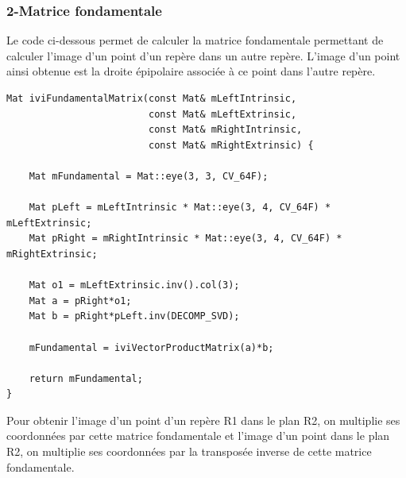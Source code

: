 \documentclass[a4paper,12pt]{report}
\begin{document}
\subsubsection*{2-Matrice fondamentale}
\noindent Le code ci-dessous permet de calculer la matrice fondamentale permettant de calculer l'image d'un point d'un repère dans un autre repère. L'image d'un point ainsi obtenue est la droite épipolaire associée à ce point dans l'autre repère.
\begin{lstlisting}[style=C++]
Mat iviFundamentalMatrix(const Mat& mLeftIntrinsic,
                         const Mat& mLeftExtrinsic,
                         const Mat& mRightIntrinsic,
                         const Mat& mRightExtrinsic) {
    
    Mat mFundamental = Mat::eye(3, 3, CV_64F);

    Mat pLeft = mLeftIntrinsic * Mat::eye(3, 4, CV_64F) * mLeftExtrinsic;
    Mat pRight = mRightIntrinsic * Mat::eye(3, 4, CV_64F) * mRightExtrinsic;

    Mat o1 = mLeftExtrinsic.inv().col(3);
    Mat a = pRight*o1;
    Mat b = pRight*pLeft.inv(DECOMP_SVD);

    mFundamental = iviVectorProductMatrix(a)*b;

    return mFundamental;
}
\end{lstlisting}
\noindent Pour obtenir l'image d'un point d'un repère R1 dans le plan R2, on multiplie ses coordonnées par cette matrice fondamentale et l'image d'un point dans le plan R2, on multiplie ses coordonnées par la transposée inverse de cette matrice fondamentale.
\end{document}
